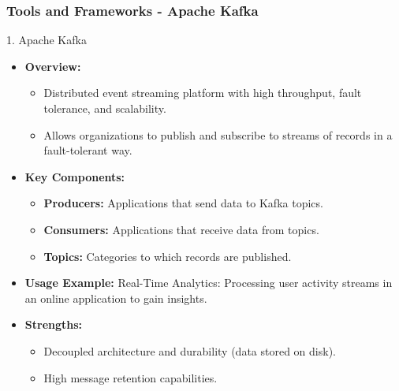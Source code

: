 \documentclass[aspectratio=169]{beamer}
\begin{document}
\begin{frame}[fragile]
    \frametitle{Tools and Frameworks - Apache Kafka}
    \begin{block}{1. Apache Kafka}
        \begin{itemize}
            \item \textbf{Overview:}
            \begin{itemize}
                \item Distributed event streaming platform with high throughput, fault tolerance, and scalability.
                \item Allows organizations to publish and subscribe to streams of records in a fault-tolerant way.
            \end{itemize}

            \item \textbf{Key Components:}
            \begin{itemize}
                \item \textbf{Producers:} Applications that send data to Kafka topics.
                \item \textbf{Consumers:} Applications that receive data from topics.
                \item \textbf{Topics:} Categories to which records are published.
            \end{itemize}

            \item \textbf{Usage Example:} 
            Real-Time Analytics: Processing user activity streams in an online application to gain insights.

            \item \textbf{Strengths:} 
            \begin{itemize}
                \item Decoupled architecture and durability (data stored on disk).
                \item High message retention capabilities.
            \end{itemize}
        \end{itemize}
    \end{block}
\end{frame}
\end{document}
